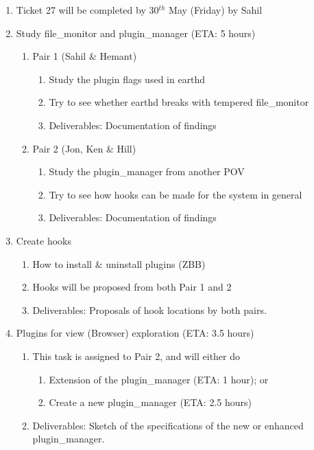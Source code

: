 \documentclass{article}
\begin{document}
\begin{enumerate}
	\item Ticket 27 will be completed by 30$^{th}$ May (Friday) by Sahil
	\item Study file\_monitor and plugin\_manager (ETA: 5 hours)
		\begin{enumerate}
			\item Pair 1 (Sahil \& Hemant)
				\begin{enumerate}
					\item Study the plugin flags used in earthd
				\item Try to see whether earthd breaks with tempered file\_monitor
					\item Deliverables: Documentation of findings
				\end{enumerate}
			\item Pair 2 (Jon, Ken \& Hill)
				\begin{enumerate}
				\item Study the plugin\_manager from another POV
				\item Try to see how hooks can be made for the system in general
					\item Deliverables: Documentation of findings
			\end{enumerate}
		\end{enumerate}
	\item Create hooks
		\begin{enumerate}
			\item How to install \& uninstall plugins (ZBB)
			\item Hooks will be proposed from both Pair 1 and 2
			  \item Deliverables: Proposals of hook locations by both pairs.
		\end{enumerate}
	\item Plugins for view (Browser) exploration (ETA: 3.5 hours)
		\begin{enumerate}
			\item This task is assigned to Pair 2, and will either do 
				\begin{enumerate}
					\item Extension of the plugin\_manager (ETA: 1 hour); or
					\item Create a new plugin\_manager (ETA: 2.5 hours)
				\end{enumerate}
			\item Deliverables: Sketch of the specifications of the new or enhanced plugin\_manager.
		\end{enumerate}

\end{enumerate}
\end{document}
